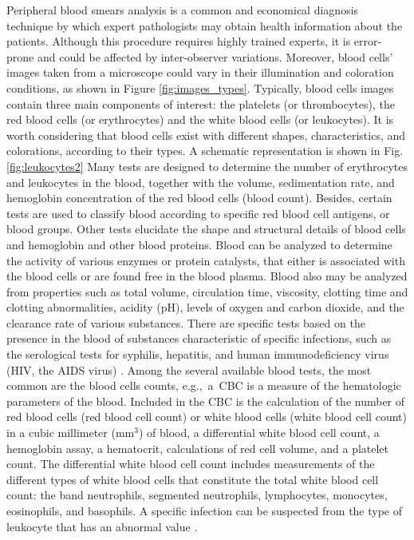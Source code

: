 \documentclass[final,a4paper,12pt,english]{UnicaPhdThesis3}
\begin{document}
Peripheral blood smears analysis is a common and economical diagnosis technique by which expert pathologists may obtain health information about the patients. Although this procedure requires highly trained experts, it is error-prone and could be affected by inter-observer variations. Moreover, blood cells' images taken from a microscope could vary in their illumination and coloration conditions, as shown in Figure \ref{fig:images_types}. Typically, blood cells images contain three main components of interest: the platelets (or thrombocytes), the red blood cells (or erythrocytes) and the white blood cells (or leukocytes). It is worth considering that blood cells exist with different shapes, characteristics, and colorations, according to their types. A schematic representation is shown in Fig. \ref{fig:leukocytes2}
Many tests are designed to determine the number of erythrocytes and leukocytes in the blood, together with the volume, sedimentation rate, and hemoglobin concentration of the red blood cells (blood count). Besides, certain tests are used to classify blood according to specific red blood cell antigens, or blood groups. Other tests elucidate the shape and structural details of blood cells and hemoglobin and other blood proteins. Blood can be analyzed to determine the activity of various enzymes or protein catalysts, that either is associated with the blood cells or are found free in the blood plasma.
Blood also may be analyzed from properties such as total volume, circulation time, viscosity, clotting time and clotting abnormalities, acidity (pH), levels of oxygen and carbon dioxide, and the clearance rate of various substances. There are specific tests based on the presence in the blood of substances characteristic of specific infections, such as the serological tests for syphilis, hepatitis, and human immunodeficiency virus (HIV, the AIDS virus) \cite{Brit}.
Among the several available blood tests, the most common are the blood cells counts, \mbox{e.g., a CBC} is a measure of the hematologic parameters of the blood. Included in the CBC is the calculation of the number of red blood cells (red blood cell count) or white blood cells (white blood cell count) in a cubic millimeter (mm$^{3}$) of blood, a differential white blood cell count, a hemoglobin assay, a hematocrit, calculations of red cell volume, and a platelet count. The differential white blood cell count includes measurements of the different types of white blood cells that constitute the total white blood cell count: the band neutrophils, segmented neutrophils, lymphocytes, monocytes, eosinophils, and basophils. A specific infection can be suspected from the type of leukocyte that has an abnormal value \cite{DiRuberto2016}.
\end{document}
